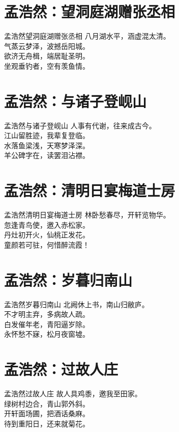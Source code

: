 \documentclass[12pt,oneside,a5paper]{book}
\begin{document}
\chapter{孟浩然：望洞庭湖赠张丞相}
\begin{poemzh}{孟浩然}{望洞庭湖赠张丞相}
八月湖水平，涵虚混太清。\\
气蒸云梦泽，波撼岳阳城。\\
欲济无舟楫，端居耻圣明。\\
坐观垂钓者，空有羡鱼情。\\ 
\end{poemzh}

\chapter{孟浩然：与诸子登岘山}
\begin{poemzh}{孟浩然}{与诸子登岘山}
人事有代谢，往来成古今。\\
江山留胜迹，我辈复登临。\\
水落鱼梁浅，天寒梦泽深。\\
羊公碑字在，读罢泪沾襟。\\ 
\end{poemzh}

\chapter{孟浩然：清明日宴梅道士房}
\begin{poemzh}{孟浩然}{清明日宴梅道士房}
林卧愁春尽，开轩览物华。\\
忽逢青鸟使，邀入赤松家。\\
丹灶初开火，仙桃正发花。\\
童颜若可驻，何惜醉流霞！\\ 
\end{poemzh}

\chapter{孟浩然：岁暮归南山}
\begin{poemzh}{孟浩然}{岁暮归南山}
北阙休上书，南山归敝庐。\\
不才明主弃，多病故人疏。\\
白发催年老，青阳逼岁除。\\
永怀愁不寐，松月夜窗墟。\\ 
\end{poemzh}

\chapter{孟浩然：过故人庄}
\begin{poemzh}{孟浩然}{过故人庄}
故人具鸡黍，邀我至田家。\\
绿树村边合，青山郭外斜。\\
开轩面场圃，把酒话桑麻。\\
待到重阳日，还来就菊花。\\ 
\end{poemzh}
\end{document}
